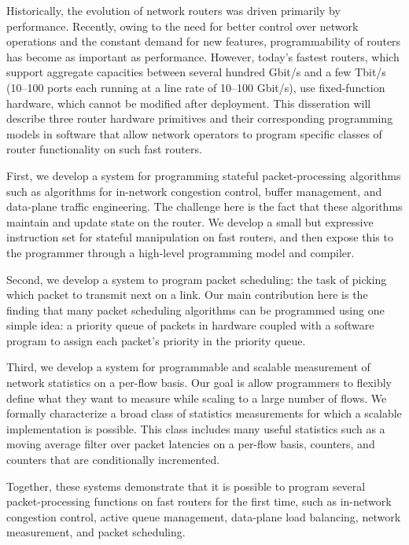 % 
% 
%
Historically, the evolution of network routers was driven primarily by
performance. Recently, owing to the need for better control over network
operations and the constant demand for new features, programmability of routers
has become as important as performance.  However, today's fastest routers,
which support aggregate capacities between several hundred Gbit/s and a few
Tbit/s (10--100 ports each running at a line rate of 10--100 Gbit/s), use
fixed-function hardware, which cannot be modified after deployment. This
disseration will describe three router hardware primitives and their
corresponding programming models in software that allow network operators to
program specific classes of router functionality on such fast routers.

First, we develop a system for programming stateful packet-processing
algorithms such as algorithms for in-network congestion control, buffer
management, and data-plane traffic engineering. The challenge here is the fact
that these algorithms maintain and update state on the router.  We develop a
small but expressive instruction set for stateful manipulation on fast routers,
and then expose this to the programmer through a high-level programming model
and compiler.

Second, we develop a system to program packet scheduling: the task of picking
which packet to transmit next on a link. Our main contribution here is the
finding that many packet scheduling algorithms can be programmed using one
simple idea: a priority queue of packets in hardware coupled with a software
program to assign each packet's priority in the priority queue.

Third, we develop a system for programmable and scalable measurement of network
statistics on a per-flow basis. Our goal is allow programmers to flexibly
define what they want to measure while scaling to a large number of flows. We
formally characterize a broad class of statistics measurements for which a
scalable implementation is possible. This class includes many useful statistics
such as a moving average filter over packet latencies on a per-flow basis,
counters, and counters that are conditionally incremented.

Together, these systems demonstrate that it is possible to program several
packet-processing functions on fast routers for the first time, such as
in-network congestion control, active queue management, data-plane load
balancing, network measurement, and packet scheduling.

